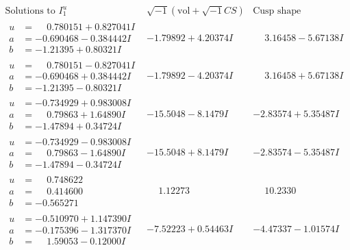 \documentclass[1p]{elsarticle_modified}
\theoremstyle{definition}
\newcommand{\I}{\sqrt{-1}}
\begin{document}
$$\begin{array}{c|c|c}  
\text{Solutions to }I^u_{1}& \I (\text{vol} + \sqrt{-1}CS) & \text{Cusp shape}\\
 \hline 
\begin{aligned}
u &= \phantom{-}0.780151 + 0.827041 I \\
a &= -0.690468 - 0.384442 I \\
b &= -1.21395 + 0.80321 I\end{aligned}
 & -1.79892 + 4.20374 I & \phantom{-}3.16458 - 5.67138 I \\ \hline\begin{aligned}
u &= \phantom{-}0.780151 - 0.827041 I \\
a &= -0.690468 + 0.384442 I \\
b &= -1.21395 - 0.80321 I\end{aligned}
 & -1.79892 - 4.20374 I & \phantom{-}3.16458 + 5.67138 I \\ \hline\begin{aligned}
u &= -0.734929 + 0.983008 I \\
a &= \phantom{-}0.79863 + 1.64890 I \\
b &= -1.47894 + 0.34724 I\end{aligned}
 & -15.5048 - 8.1479 I & -2.83574 + 5.35487 I \\ \hline\begin{aligned}
u &= -0.734929 - 0.983008 I \\
a &= \phantom{-}0.79863 - 1.64890 I \\
b &= -1.47894 - 0.34724 I\end{aligned}
 & -15.5048 + 8.1479 I & -2.83574 - 5.35487 I \\ \hline\begin{aligned}
u &= \phantom{-}0.748622\phantom{ +0.000000I} \\
a &= \phantom{-}0.414600\phantom{ +0.000000I} \\
b &= -0.565271\phantom{ +0.000000I}\end{aligned}
 & \phantom{-}1.12273\phantom{ +0.000000I} & \phantom{-}10.2330\phantom{ +0.000000I} \\ \hline\begin{aligned}
u &= -0.510970 + 1.147390 I \\
a &= -0.175396 - 1.317370 I \\
b &= \phantom{-}1.59053 - 0.12000 I\end{aligned}
 & -7.52223 + 0.54463 I & -4.47337 - 1.01574 I \\ \hline\begin{aligned}

\end{aligned}
\end{array}$$
\end{document}
